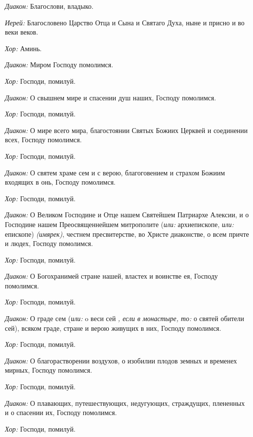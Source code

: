 \begin{mymulticols}

{\itshape Диакон:} Благослови, владыко.

{\itshape Иерей:} Благословено Царство Отца и Сына и Святаго Духа, ныне и присно и во веки веков. 

{\itshape Хор:} Аминь.


{\itshape Диакон:} Миром Господу помолимся. 

{\itshape Хор:} Господи, помилуй.

{\itshape Диакон:} О свышнем мире и спасении душ наших, Господу помолимся. 

{\itshape Хор:} Господи, помилуй.

{\itshape Диакон:} О мире всего мира, благостоянии Святых Божиих Церквей и соединении всех, Господу помолимся.

{\itshape Хор:} Господи, помилуй.

{\itshape Диакон:} О святем храме сем и с верою, благоговением и страхом Божиим входящих в онь, Господу помолимся. 

{\itshape Хор:} Господи, помилуй.

{\itshape Диакон:} О Великом Господине и Отце нашем Святейшем Патриархе Алексии, и о Господине нашем Преосвященнейшем митрополите ({\itshape или:} архиепископе, {\itshape или:} епископе) {\itshape (имярек)}, честнем пресвитерстве, во Христе диаконстве, о всем причте и людех, Господу помолимся. 

{\itshape Хор:} Господи, помилуй.

{\itshape Диакон:} О Богохранимей стране нашей, властех и воинстве ея, Господу помолимся.

{\itshape Хор:} Господи, помилуй.

{\itshape Диакон:} О граде сем ({\itshape или:} o веси сей {\itshape, если в монастыре, то: } о святей обители сей), всяком граде, стране и верою живущих в них, Господу помолимся. 

{\itshape Хор:} Господи, помилуй.

{\itshape Диакон:} О благорастворении воздухов, о изобилии плодов земных и временех мирных, Господу помолимся.

{\itshape Хор:} Господи, помилуй.

{\itshape Диакон:} О плавающих, путешествующих, недугующих, страждущих, плененных и о спасении их, Господу помолимся. 

{\itshape Хор:} Господи, помилуй.


\end{mymulticols}
